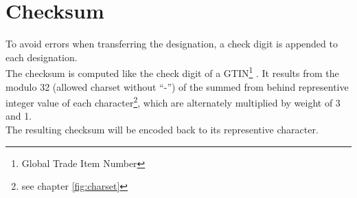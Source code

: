 %
%
%
%
%
%
%

\section{Checksum}
\label{chap:checksum}

To avoid errors when transferring the designation, a check digit is appended to
each designation. \\

The checksum is computed like the check digit of a GTIN\footnote{Global Trade
Item Number} \cite{ean_checksum}. It results from
the modulo 32 (allowed charset without ``-'') of the summed from behind
representive integer value of each character\footnote{\label{foot:charset}see
chapter \ref{fig:charset}}, which are alternately multiplied by weight of 3 and
1. \\

The resulting checksum will be encoded back to its representive
character.

